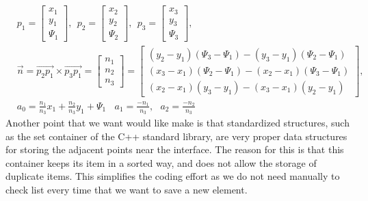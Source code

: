 \documentclass[letterpaper,10pt]{article}
\begin{document}
\begin{align}
&p_1=
\begin{bmatrix}
    x_1 \\
    y_1 \\
    \varPsi_1
\end{bmatrix}
,\ \ 
p_2=
\begin{bmatrix}
    x_2 \\
    y_2 \\
    \varPsi_2
\end{bmatrix} 
,\ \ p_3=
\begin{bmatrix}
    x_3 \\
    y_3 \\
    \varPsi_3
\end{bmatrix}, \nonumber\\
&\overrightarrow{n}=\overrightarrow{p_2p_1}\times\overrightarrow{p_3p_1}=
\begin{bmatrix}
    n_1 \\
    n_2 \\
    n_3
\end{bmatrix}=
\begin{bmatrix}
    (y_2-y_1)(\varPsi_3-\varPsi_1)-(y_3-y_1)(\varPsi_2-\varPsi_1) \\
    (x_3-x_1)(\varPsi_2-\varPsi_1)-(x_2-x_1)(\varPsi_3-\varPsi_1) \\
    (x_2-x_1)(y_3-y_1)-(x_3-x_1)(y_2-y_1)
\end{bmatrix},\\
&a_0=\frac{n_1}{n_3}x_1+\frac{n_2}{n_3}y_1+\varPsi_1 \ \ \  \ a_1=\frac{-n_1}{n_3}, \ \ \ a_2=\frac{-n_2}{n_3}
\end{align}
Another point that we want would like make is that standardized structures, such as the set container of the C++ standard library, are very proper data structures for storing the 
adjacent points near the interface. The reason for this is that this container keeps its item in a sorted way, and does not allow the storage of duplicate items. 
This simplifies the coding effort as we do not need manually to check list every time that we want to save a new element. 
\end{document}
